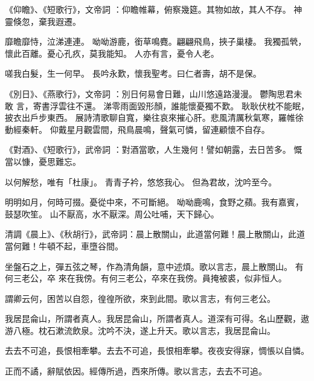 \begin{pinyinscope}
《仰瞻》、《短歌行》，文帝詞
 ：仰瞻帷幕，俯察幾筵。其物如故，其人不存。
 神靈倏忽，棄我遐遷。


靡瞻靡恃，泣涕連連。
 呦呦游鹿，銜草鳴麑。翩翩飛鳥，挾子巢棲。
 我獨孤煢，懷此百離。憂心孔疚，莫我能知。
 人亦有言，憂令人老。


嗟我白髮，生一何早。
 長吟永歎，懷我聖考。曰仁者壽，胡不是保。


《別日》、《燕歌行》，文帝詞
 ：別日何易會日難，山川悠遠路漫漫。
 鬱陶思君未敢
 言，寄書浮雲往不還。
 涕零雨面毀形顏，誰能懷憂獨不歎。
 耿耿伏枕不能眠，披衣出戶步東西。
 展詩清歌聊自寬，樂往哀來摧心肝。悲風清厲秋氣寒，羅帷徐動經秦軒。
 仰戴星月觀雲間，飛鳥晨鳴，聲氣可憐，留連顧懷不自存。




《對酒》、《短歌行》，武帝詞
 ：對酒當歌，人生幾何！譬如朝露，去日苦多。
 慨當以慷，憂思難忘。


以何解愁，唯有「杜康」。
 青青子衿，悠悠我心。
 但為君故，沈吟至今。


 明明如月，何時可掇。憂從中來，不可斷絕。
 呦呦鹿鳴，食野之蘋。我有嘉賓，鼓瑟吹笙。
 山不厭高，水不厭深。周公吐哺，天下歸心。





 清調《晨上》、《秋胡行》，武帝詞：晨上散關山，此道當何難！晨上散關山，此道當何難！牛頓不起，車墮谷間。


坐盤石之上，彈五弦之琴，作為清角韻，意中述煩。歌以言志，晨上散關山。
 有何三老公，卒
 來在我傍。有何三老公，卒來在我傍。員掩被裘，似非恒人。


謂卿云何，困苦以自怨，徨徨所欲，來到此間。歌以言志，有何三老公。


我居昆侖山，所謂者真人。我居昆侖山，所謂者真人。道深有可得。名山歷觀，遨游八極。枕石漱流飲泉。沈吟不決，遂上升天。歌以言志，我居昆侖山。



 去去不可追，長恨相牽攀。去去不可追，長恨相牽攀。夜夜安得寐，惆悵以自憐。


正而不譎，辭賦依因。經傳所過，西來所傳。歌以言志，去去不可追。



\end{pinyinscope}

